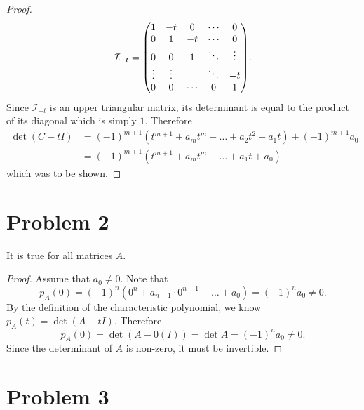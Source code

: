 \documentclass{article}
\begin{document}
\begin{proof}
    \[
        \mathcal{I}_{-t} = \mqty(
        1 & -t & 0 & \cdots & 0 \\
        0 & 1 & -t & \cdots & 0 \\
        0 & 0 & 1 & \ddots & \vdots \\
        \vdots & \vdots &  & \ddots  & -t \\
         0 & 0 & \cdots & 0 & 1 \\
        )
    .\]
    Since $\mathcal{I}_{-t}$ is an upper triangular matrix, its determinant is equal to the product of its diagonal which is simply $1$. Therefore
    \begin{align*}
        \det(C - tI) &= (-1)^{m+1} (t^{m+1} + a_{m} t^{m} + \ldots + a_2 t^2 + a_1 t) + (-1)^{m+1} a_0 \\
        &= (-1)^{m+1} (t^{m+1} + a_{m} t^m + \ldots + a_1 t + a_0)
    \end{align*}
    which was to be shown.
\end{proof}
\newpage

\section*{Problem 2}
It is true for all matrices $A$. 

\begin{proof}
    Assume that $a_0 \neq 0$. Note that
    \[
        p_{A}(0) = (-1)^n (0^n + a_{n-1} \cdot 0^{n-1} + \ldots + a_0) = (-1)^n a_0 \neq 0
    .\]
    By the definition of the characteristic polynomial, we know $p_A(t) = \det(A - t I)$. Therefore
    \[
        p_A(0) = \det(A - 0(I)) = \det A = (-1)^n a_0 \neq 0
    .\]
    Since the determinant of $A$ is non-zero, it must be invertible.
\end{proof}

\section*{Problem 3}
\end{document}
